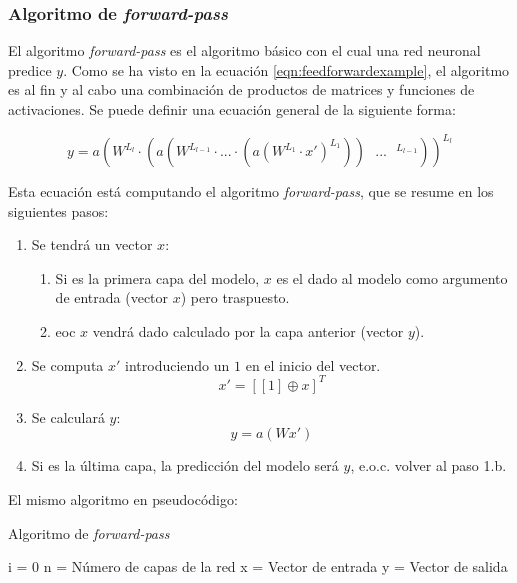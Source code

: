 \subsubsection{Algoritmo de \textit{forward-pass}}\label{feedforward}
El algoritmo \textit{forward-pass} es el algoritmo básico con el cual una red neuronal predice $y$. Como se ha visto en la ecuación \ref{eqn:feedforwardexample}, el algoritmo es al fin y al cabo una combinación de productos de matrices y funciones de activaciones. Se puede definir una ecuación general de la siguiente forma:

\begin{equation}
    y = a(W^{L_l} \cdot (a(W^{L_{l-1}} \cdot ... \cdot (a(W^{L_1} \cdot x')^{L_1})) \text{ } ... \text{ } ^{L_{l-1}}))^{L_l}
    \label{eqn:feedforward}
\end{equation}

Esta ecuación está computando el algoritmo \textit{forward-pass}, que se resume en los siguientes pasos:

\begin{enumerate}
\item Se tendrá un vector $x$:
\begin{enumerate}
    \item Si es la primera capa del modelo, $x$ es el dado al modelo como argumento de entrada (vector $x$) pero traspuesto.
    \item \acrshort{eoc} $x$ vendrá dado calculado por la capa anterior (vector $y$).
\end{enumerate}
\item Se computa $x'$ introduciendo un $1$ en el inicio del vector.
\begin{equation}
  x' = [[1] \oplus x]^T
\end{equation}

\item Se calculará $y$:
\begin{equation}
  y = a(Wx')
\end{equation}
\item Si es la última capa, la predicción del modelo será $y$, e.o.c. volver al paso 1.b.
\end{enumerate}

El mismo algoritmo en pseudocódigo:

\begin{algorithm}[H]
\caption{Algoritmo de \textit{forward-pass}}
\SetAlgoLined
{}
 i = 0\;
 n = Número de capas de la red\;
 x = Vector de entrada\;
 y = Vector de salida\;
\end{algorithm}


